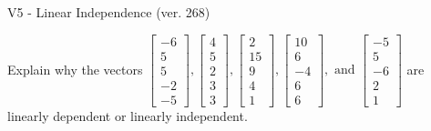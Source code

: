 \begin{exercise}
  \begin{exerciseTitle}V5 - Linear Independence (ver. 268)\end{exerciseTitle}
  \begin{exerciseStatement}
    Explain why the vectors \(\left[\begin{array}{r}
-6 \\
5 \\
5 \\
-2 \\
-5
\end{array}\right] , \left[\begin{array}{r}
4 \\
5 \\
2 \\
3 \\
3
\end{array}\right] , \left[\begin{array}{r}
2 \\
15 \\
9 \\
4 \\
1
\end{array}\right] , \left[\begin{array}{r}
10 \\
6 \\
-4 \\
6 \\
6
\end{array}\right] , \text{ and } \left[\begin{array}{r}
-5 \\
5 \\
-6 \\
2 \\
1
\end{array}\right]\) are linearly dependent or linearly independent.	



\end{exerciseStatement}
\end{exercise}
